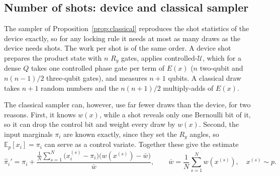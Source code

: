 \subsection{Number of shots: device and classical sampler}
\label{app:shots}
The sampler of Proposition~\ref{prop:classical} reproduces the shot statistics of the device exactly, so for any locking rule it needs at most as many draws as the device needs shots. The work per shot is of the same order. A device shot prepares the product state with $n$ $R_y$ gates, applies controlled-$\mathcal{U}$, which for a dense $Q$ takes one controlled phase gate per term of $E(x)$ ($n$ two-qubit and $n(n-1)/2$ three-qubit gates), and measures $n+1$ qubits. A classical draw takes $n+1$ random numbers and the $n(n+1)/2$ multiply-adds of $E(x)$.

The classical sampler can, however, use far fewer draws than the device, for two reasons. First, it knows $w(x)$, while a shot reveals only one Bernoulli bit of it, so it can drop the control bit and weight every draw by $w(x)$. Second, the input marginals $\pi_i$ are known exactly, since they set the $R_y$ angles, so $\mathbb{E}_p[x_i]=\pi_i$ can serve as a control variate. Together these give the estimate
\begin{equation}
\hat\pi_i'=\pi_i+\frac{\frac1N\sum_{s=1}^{N}\bigl(x^{(s)}_i-\pi_i\bigr)\bigl(w(x^{(s)})-\bar w\bigr)}{\bar w},\qquad \bar w=\frac1N\sum_{s=1}^{N}w(x^{(s)}),\quad x^{(s)}\sim p .
\label{eq:app-weighted}
\end{equation}
